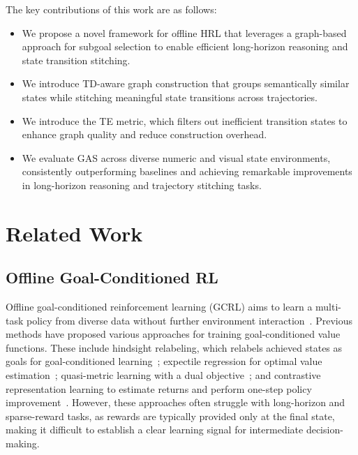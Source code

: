 \documentclass{article}
\begin{document}
The key contributions of this work are as follows:
\begin{itemize}[leftmargin=1.0em, itemsep=0.5em, topsep=3.0pt]
\item We propose a novel framework for offline HRL that leverages a graph-based approach for subgoal selection to enable efficient long-horizon reasoning and state transition stitching.
\item We introduce TD-aware graph construction that groups semantically similar states while stitching meaningful state transitions across trajectories.
\item We introduce the TE metric, which filters out inefficient transition states to enhance graph quality and reduce construction overhead.
\item We evaluate GAS across diverse numeric and visual state environments, consistently outperforming baselines and achieving remarkable improvements in long-horizon reasoning and trajectory stitching tasks.
\end{itemize}


\section{Related Work}
\subsection{Offline Goal-Conditioned RL}
Offline goal-conditioned reinforcement learning (GCRL) aims to learn a multi-task policy from diverse data without further environment interaction~\cite{ma2022gofar, yang2023essential, cao2024offline, sikchi2024smore, wang2024goplan}. Previous methods have proposed various approaches for training goal-conditioned value functions. These include hindsight relabeling, which relabels achieved states as goals for goal-conditioned learning~\cite{andrychowicz2017hindsight}; expectile regression for optimal value estimation~\cite{kostrikov2022offline, park2023hiql}; quasi-metric learning with a dual objective~\cite{wang2023optimal}; and contrastive representation learning to estimate returns and perform one-step policy improvement~\cite{eysenbach2022contrastive, zheng2024stabilizing}. However, these approaches often struggle with long-horizon and sparse-reward tasks, as rewards are typically provided only at the final state, making it difficult to establish a clear learning signal for intermediate decision-making. 
\end{document}
